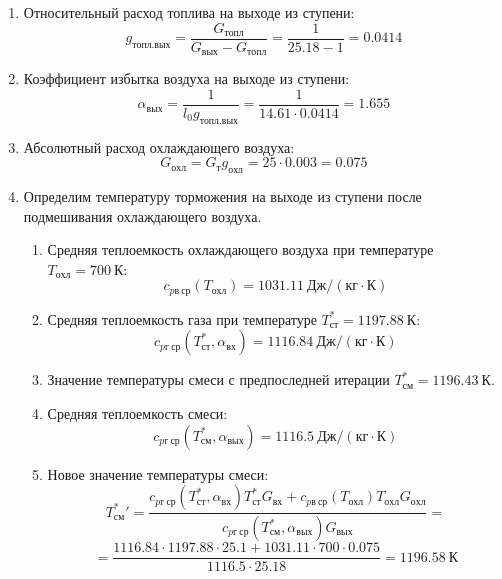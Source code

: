 \documentclass[a4paper,10pt]{article}
\begin{document}
\begin{enumerate}
        \item Относительный расход топлива на выходе из ступени:
        \[
            g_{топл.вых} = \frac{ G_{топл} }{ G_{вых} - G_{топл} } =
                 \frac{ 1 }{ 25.18 - 1 } =
            0.0414
        \]

        \item Коэффициент избытка воздуха на выходе из ступени:
        \[
            \alpha_{вых} = \frac{ 1 }{ l_0 g_{топл.вых} } =
                \frac{ 1 }{ 14.61 \cdot 0.0414 } =
            1.655
        \]

        \item Абсолютный расход охлаждающего воздуха:
        \[
            G_{охл} = G_т g_{охл} = 25 \cdot 0.003 =
            0.075
        \]

        \item Определим температуру торможения на выходе из ступени после подмешивания охлаждающего воздуха.
        \begin{enumerate}

            \item Средняя теплоемкость охлаждающего воздуха при температуре $T_{охл} = 700\ К $:
            \[
                c_{pв\ ср} (T_{охл}) = 1031.11\ Дж/ (кг \cdot К)
            \]

            \item Средняя теплоемкость газа при температуре $T_{ст}^* = 1197.88 \ К $:
            \[
                c_{pг\ ср} (T_{ст}^*, \alpha_{вх}) =
                1116.84\ Дж/ (кг \cdot К)
            \]

            \item Значение температуры смеси с предпоследней итерации $T_{см}^{*} = 1196.43\ К$.

            \item Средняя теплоемкость смеси:
            \[
                c_{pг\ ср} (T_{см}^{*}, \alpha_{вых}) =
                1116.5\ Дж/ (кг \cdot К)
            \]

            \item Новое значение температуры смеси:
            \[
                T_{см}^*\prime = \frac{
                        c_{pг\ ср} (T_{ст}^*, \alpha_{вх}) T_{ст}^* G_{вх} + c_{pв\ ср} (T_{охл}) T_{охл} G_{охл}
                    }{
                        c_{pг\ ср} (T_{см}^{*}, \alpha_{вых}) G_{вых}
                    } =
            \]
            \[    = \frac{
                    1116.84
                    \cdot 1197.88 \cdot 25.1 +
                    1031.11
                    \cdot 700 \cdot 0.075
                }{
                    1116.5
                    \cdot  25.18
                } =
                1196.58\ К
            \]


\end{enumerate}
\end{enumerate}
\end{document}
